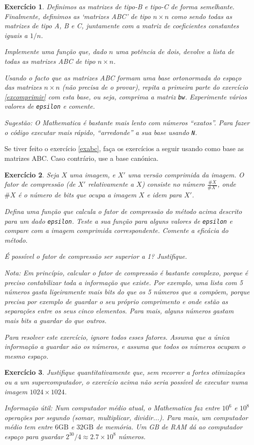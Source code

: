 \documentclass{article}
\newtheorem{ex}{Exercício}[section]
\begin{document}
\begin{ex}
Definimos as matrizes de tipo-B e tipo-C de forma semelhante. Finalmente, definimos as `matrizes ABC' de tipo $n \times n$ como sendo todas as matrizes de tipo A, B e C, juntamente com a matriz de coeficientes constantes iguais a $1/n$.

Implemente uma função que, dado $n$ uma potência de dois, devolve a lista de todas as matrizes ABC de tipo $n \times n$.

Usando o facto que as matrizes ABC formam uma base ortonormada do espaço das matrizes $n \times n$ (não precisa de o provar), repita a primeira parte do exercício \ref{excomprimir} com esta base, ou seja, comprima a matriz \texttt{bw}. Experimente vários valores de \texttt{epsilon} e comente.

Sugestão: O \textit{Mathematica} é bastante mais lento com números ``exatos''. Para fazer o código executar mais rápido, ``arredonde'' a sua base usando \texttt{N}.
\end{ex}

Se tiver feito o exercício \ref{exabc}, faça os exercícios a seguir usando como base as matrizes ABC. Caso contrário, use a base canónica.

\begin{ex}
Seja $X$ uma imagem, e $X'$ uma versão comprimida da imagem. O fator de compressão (de $X'$ relativamente a $X$) consiste no número $\frac{\#X}{\#X'}$, onde $\#X$ é o número de bits que ocupa a imagem $X$ e idem para $X'$.

Defina uma função que calcula o fator de compressão do método acima descrito para um dado \texttt{epsilon}. Teste a sua função para alguns valores de \texttt{epsilon} e compare com a imagem comprimida correspondente. Comente a eficácia do método.

É possível o fator de compressão ser superior a 1? Justifique.

\smallskip

Nota: Em princípio, calcular o fator de compressão é bastante complexo, porque é preciso contabilizar toda a informação que existe. Por exemplo, uma lista com 5 números gasta ligeiramente mais bits do que os 5 números que a compõem, porque precisa por exemplo de guardar o seu próprio comprimento e onde estão as separações entre os seus cinco elementos. Para mais, alguns números gastam mais bits a guardar do que outros.

Para resolver este exercício, ignore todos esses fatores. Assuma que a única informação a guardar são os números, e assuma que todos os números ocupam o mesmo espaço.
\end{ex}

\begin{ex}
Justifique quantitativamente que, sem recorrer a fortes otimizações ou a um supercomputador, o exercício acima não seria possível de executar numa imagem $1024 \times 1024$.

Informação útil: Num computador médio atual, o Mathematica faz entre $10^6$ e $10^8$ operações por segundo (somar, multiplicar, dividir...). Para mais, um computador médio tem entre $6 \mathrm{GB}$ e $32 \mathrm{GB}$ de memória. Um GB de RAM dá ao computador espaço para guardar $2^{30} / 4 \approx 2.7 \times 10^8$ números.
\end{ex}
\end{document}
